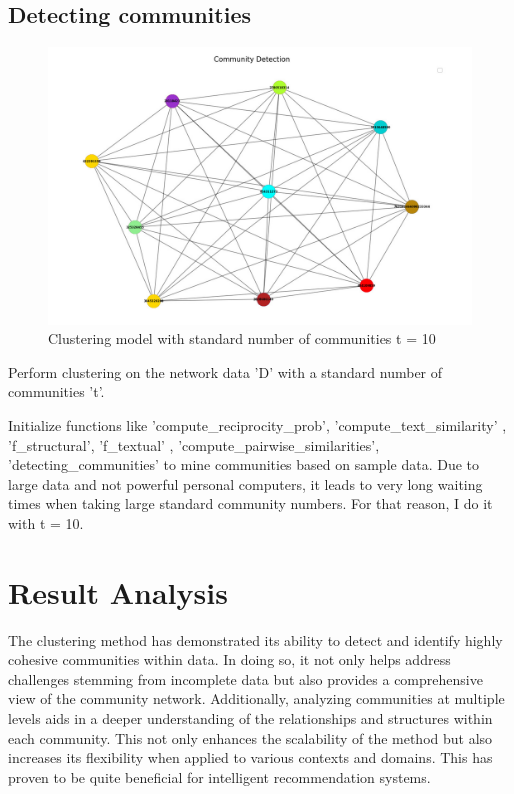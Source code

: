 \documentclass[conference]{IEEEtran}
\begin{document}
\subsection{Detecting communities}

\begin{figure}[htbp]
    \centerline{\includegraphics[scale=0.15]{fig6.png}}
    \caption{Clustering model with standard number of communities t = 10}
    \label{fig6}
\end{figure}

Perform clustering on the network data 'D' with a standard number of communities 't'.

Initialize functions like 'compute\_reciprocity\_prob', 'compute\_text\_similarity' , 'f\_structural', 'f\_textual' , 'compute\_pairwise\_similarities', 'detecting\_communities' to mine communities based on sample data.
Due to large data and not powerful personal computers, it leads to very long waiting times when taking large standard community numbers. For that reason, I do it with t = 10.

\section{Result Analysis}
The clustering method has demonstrated its ability to detect and identify highly cohesive communities within data.
In doing so, it not only helps address challenges stemming from incomplete data but also provides a comprehensive view of the community network.
Additionally, analyzing communities at multiple levels aids in a deeper understanding of the relationships and structures within each community.
This not only enhances the scalability of the method but also increases its flexibility when applied to various contexts and domains. This has proven to be quite beneficial for intelligent recommendation systems.
\end{document}
